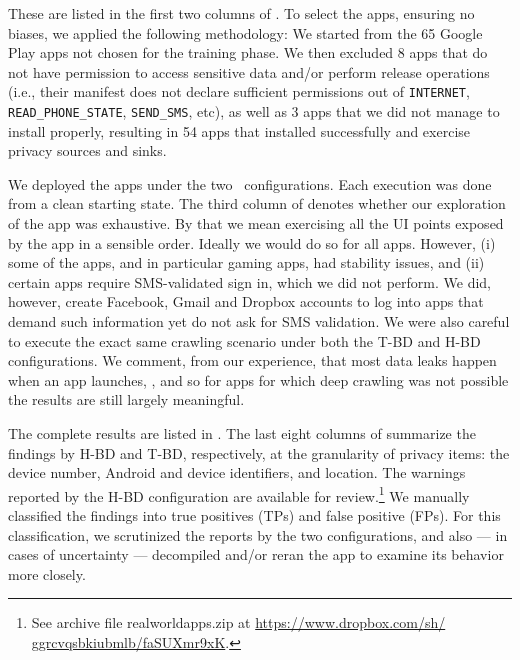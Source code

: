  These are listed in the first two columns of . To select the apps, ensuring no biases, we applied the following methodology: We started from the 65 Google Play apps not chosen for the training phase. We then excluded 8 apps that do not have permission to access sensitive data and/or perform release operations (i.e., their manifest does not declare sufficient permissions out of {\tt INTERNET}, {\tt READ\_PHONE\_STATE}, {\tt SEND\_SMS}, etc), as well as 3 apps that we did not manage to install properly, resulting in 54 apps that installed successfully and exercise privacy sources and sinks.
 
We deployed the apps under the two \Tool\ configurations. Each execution was done from a clean starting state. 
The third column of  denotes whether our exploration of the app was exhaustive. By that we mean exercising all the UI points exposed by the app in a sensible order. Ideally we would do so for all apps. However, (i) some of the apps, and in particular gaming apps, had stability issues, and (ii) certain apps require SMS-validated sign in, which we did not perform. We did, however, create Facebook, Gmail and Dropbox accounts to log into apps that demand such information yet do not ask for SMS validation. We were also careful to execute the exact same crawling scenario under both the T-BD and H-BD configurations. We comment, from our experience, that most data leaks happen when an app launches, , and so for apps for which deep crawling was not possible the results are still largely meaningful. 
 
The complete results are listed in . The last eight columns of  summarize the findings by H-BD and T-BD, respectively, at the granularity of privacy items: the device number, Android and device identifiers, and location. 
%
%
The warnings reported by the H-BD configuration are available for review.\footnote{
	See archive file realworldapps.zip at \href{https://www.dropbox.com/sh/ggrcvqsbkiubmlb/faSUXmr9xK}{https://www.dropbox.com/sh/
	ggrcvqsbkiubmlb/faSUXmr9xK}.
}
%
We manually classified the findings into true positives (TPs) and false positive (FPs). For this classification, we scrutinized the reports by the two configurations, and also --- in cases of uncertainty --- decompiled and/or reran the app to examine its behavior more closely. 

